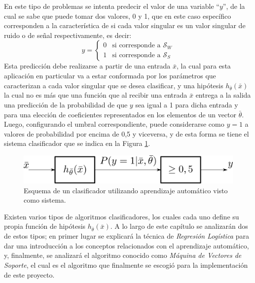 En este tipo de problemas se intenta predecir el valor de una variable ``$y$'', de la cual se sabe que puede tomar dos valores, 0 y 1, que en este caso específico corresponden a la característica de si cada valor singular es un valor singular de ruido o de señal respectivamente, es decir:
\begin{equation}
  y=\left\{\begin{matrix}
    0 & \textrm{si corresponde a }\mathcal{S}_W \\
    1 & \textrm{si corresponde a }\mathcal{S}_S
  \end{matrix}\right.
\end{equation}
Esta predicción debe realizarse a partir de una entrada $\bar{x}$, la cual para esta aplicación en particular va a estar conformada por los parámetros que caracterizan a cada valor singular que se desea clasificar, y una hipótesis $h_{\bar{\theta}}(\bar{x})$ la cual no es más que una función que al recibir una entrada $\bar{x}$ entrega a la salida una predicción de la probabilidad de que $y$ sea igual a 1 para dicha entrada y para una elección de coeficientes representados en los elementos de un vector $\bar{\theta}$. Luego, configurando el umbral correspondiente, puede considerarse como $y=1$ a valores de probabilidad por encima de 0,5 y viceversa, y de esta forma se tiene el sistema clasificador que se indica en la Figura \ref{fig:ml_classificator_system}.
\begin{figure}[ht!]
  \centering
  \includegraphics[width=0.7\linewidth]{images/05-Machine Learning/ml_classificator_system.png}
  \caption{Esquema de un clasificador utilizando aprendizaje automático visto como sistema.}
  \label{fig:ml_classificator_system}
\end{figure}

Existen varios tipos de algoritmos clasificadores, los cuales cada uno define su propia función de hipótesis $h_{\bar{\theta}}(\bar{x})$. A lo largo de este capítulo se analizarán dos de estos tipos; en primer lugar se explicará la técnica de \emph{Regresión Logística} para dar una introducción a los conceptos relacionados con el aprendizaje automático, y, finalmente, se analizará el algoritmo conocido como \emph{Máquina de Vectores de Soporte}, el cual es el algoritmo que finalmente se escogió para la implementación de este proyecto.

